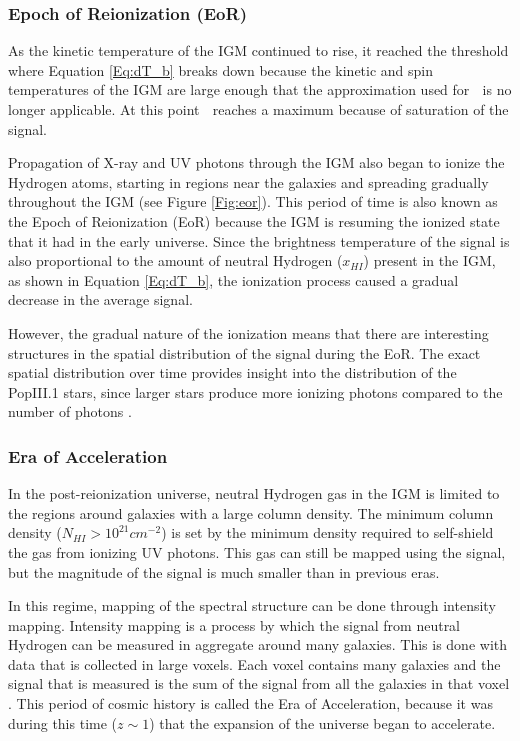 \subsubsection{Epoch of Reionization (EoR)}

As the kinetic temperature of the IGM continued to rise, it reached the threshold where Equation \ref{Eq:dT_b} breaks down because the kinetic and spin temperatures of the IGM are large enough that the approximation used for \tu $\;$ is no longer applicable. At this point \dtb$\;$ reaches a maximum because of saturation of the signal. 

Propagation of X-ray and UV photons through the IGM also began to ionize the Hydrogen atoms, starting in regions near the galaxies and spreading gradually throughout the IGM (see Figure \ref{Fig:eor}). This period of time is also known as the Epoch of Reionization (EoR) because the IGM is resuming the ionized state that it had in the early universe. Since the brightness temperature of the \cm signal is also proportional to the amount of neutral Hydrogen ($x_{HI}$) present in the IGM, as shown in Equation \ref{Eq:dT_b}, the ionization process caused a gradual decrease in the average \cm signal. 

However, the gradual nature of the ionization means that there are interesting structures in the spatial distribution of the \cm signal during the EoR. The exact spatial distribution over time provides insight into the distribution of the PopIII.1 stars, since larger stars produce more ionizing photons compared to the number of \lya  photons \cite{furlanetto_2006}. 

\subsubsection{Era of Acceleration}

In the post-reionization universe, neutral Hydrogen gas in the IGM is limited to the regions around galaxies with a large column density. The minimum column density ($N_{HI}>10^{21} cm^{-2}$) is set by the minimum density required to self-shield the gas from ionizing UV photons. This gas can still be mapped using the \cm signal, but the magnitude of the signal is much smaller than in previous eras. 

In this regime, mapping of the spectral structure can be done through intensity mapping. Intensity mapping is a process by which the signal from neutral Hydrogen can be measured in aggregate around many galaxies. This is done with data that is collected in large voxels. Each voxel contains many galaxies and the \cm signal that is measured is the sum of the \cm signal from all the galaxies in that voxel \cite{masui_2012}. This period of cosmic history is called the Era of Acceleration, because it was during this time ($z \sim 1$) that the expansion of the universe began to accelerate. 

